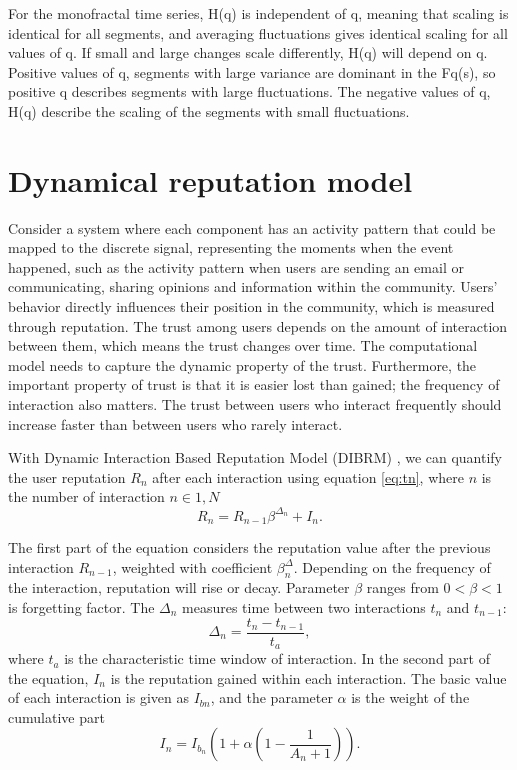 For the monofractal time series, H(q) is independent of q, meaning that scaling is identical for all segments, and averaging fluctuations gives identical scaling for all values of q. If small and large changes scale differently, H(q) will depend on q. Positive values of q, segments with large variance are dominant in the Fq(s), so positive q describes segments with large fluctuations. The negative values of q, H(q) describe the scaling of the segments with small fluctuations. 





\section{Dynamical reputation model} \label{sec:met_dibrm}

Consider a system where each component has an activity pattern that could be mapped to the discrete signal, representing the moments when the event happened, such as the activity pattern when users are sending an email or communicating, sharing opinions and information within the community. Users' behavior directly influences their position in the community, which is measured through reputation. The trust among users depends on the amount of interaction between them, which means the trust changes over time. The computational model needs to capture the dynamic property of the trust. Furthermore, the important property of trust is that it is easier lost than gained; the frequency of interaction also matters. The trust between users who interact frequently should increase faster than between users who rarely interact. 

With Dynamic Interaction Based Reputation Model (DIBRM) \cite{melnikov2018toward}, we can quantify the user reputation $R_n$ after each interaction using equation \ref{eq:tn}, where $n$ is the number of interaction $n\in{1, N}$
\begin{equation}\label{eq:tn}
R_{n}=R_{n-1} \beta^{\Delta_{n}} + I_{n}.
\end{equation}

The first part of the equation considers the reputation value after the previous interaction $R_{n-1}$, weighted with coefficient $\beta^\Delta_{n}$. Depending on the frequency of the interaction, reputation will rise or decay. Parameter $\beta$ ranges from $0<\beta < 1$ is forgetting factor. The $\Delta_n$ measures time between two interactions $t_n$ and $t_{n-1}$: 
\begin{equation}\label{eq:deltan}
\Delta_{n}=\frac{t_{n}-t_{n-1}}{t_{a}},
\end{equation}
where $t_a$ is the characteristic time window of interaction. In the second part of the equation, $I_n$ is the reputation gained within each interaction. The basic value of each interaction is given as $I_{bn}$, and the parameter $\alpha$ is the weight of the cumulative part 
\begin{equation}\label{eq:ibn}
I_n  = I_{b_{n}}(1 +  \alpha  (1-\frac{1}{A_n+1})).
\end{equation}

